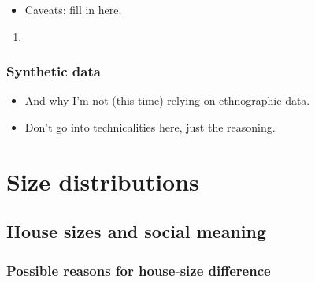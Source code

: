 \documentclass[
  12pt,
]{book}
\providecommand{\tightlist}{%
  \setlength{\itemsep}{0pt}\setlength{\parskip}{0pt}}
\begin{document}
\begin{itemize}
\tightlist
\item
  Caveats: fill in here.
\end{itemize}

\begin{enumerate}
\def\labelenumi{\arabic{enumi}.}
\tightlist
\item
\end{enumerate}

\hypertarget{synthetic-data}{%
\section{Synthetic data}\label{synthetic-data}}

\begin{itemize}
\item
  And why I'm not (this time) relying on ethnographic data.
\item
  Don't go into technicalities here, just the reasoning.
\end{itemize}

\hypertarget{part-size-distributions}{%
\part{Size distributions}\label{part-size-distributions}}

\hypertarget{house-sizes-theory}{%
\chapter{House sizes and social meaning}\label{house-sizes-theory}}

\hypertarget{possible-reasons-for-house-size-difference}{%
\section{Possible reasons for house-size difference}\label{possible-reasons-for-house-size-difference}}
\end{document}
